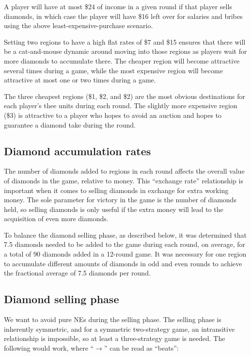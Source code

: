 \documentclass[12pt]{article}
\begin{document}
A player will have at most \$24 of income in a given round if that player sells diamonds, in which case the player will have \$16 left over for salaries and bribes using the above least-expensive-purchase scenario.

Setting two regions to have a high flat rates of \$7 and \$15 ensures that there will be a cat-and-mouse dynamic around moving into those regions as players wait for more diamonds to accumulate there.  The cheaper region will become attractive several times during a game, while the most expensive region will become attractive at most one or two times during a game.

The three cheapest regions (\$1, \$2, and \$2) are the most obvious destinations for each player's thee units during each round.  The slightly more expensive region (\$3) is attractive to a player who hopes to avoid an auction and hopes to guarantee a diamond take during the round.


\subsection{Diamond accumulation rates}
The number of diamonds added to regions in each round affects the overall value of diamonds in the game, relative to money.  This ``exchange rate'' relationship is important when it comes to selling diamonds in exchange for extra working money.  The sole parameter for victory in the game is the number of diamonds held, so selling diamonds is only useful if the extra money will lead to the acquisition of even more diamonds.

To balance the diamond selling phase, as described below, it was determined that 7.5 diamonds needed to be added to the game during each round, on average, for a total of 90 diamonds added in a 12-round game.  It was necessary for one region to accumulate different amounts of diamonds in odd and even rounds to achieve the fractional average of 7.5 diamonds per round.


\subsection{Diamond selling phase}
We want to avoid pure NEs during the selling phase.  The selling phase is inherently symmetric, and for a symmetric two-strategy game, an intransitive relationship is impossible, so at least a three-strategy game is needed.  The following would work, where ``$\longrightarrow$'' can be read as ``beats'':
\end{document}
